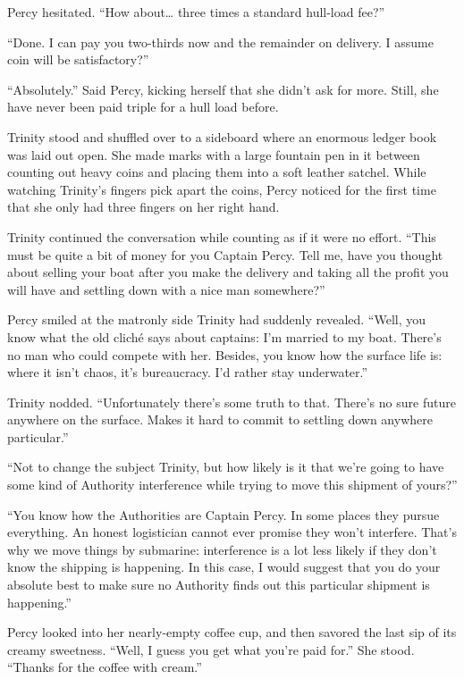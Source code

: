 \documentclass[
]{scrbook}
\begin{document}
Percy hesitated. ``How about\ldots{} three times a standard hull-load
fee?''

``Done. I can pay you two-thirds now and the remainder on delivery. I
assume coin will be satisfactory?''

``Absolutely.'' Said Percy, kicking herself that she didn't ask for
more. Still, she have never been paid triple for a hull load before.

Trinity stood and shuffled over to a sideboard where an enormous ledger
book was laid out open. She made marks with a large fountain pen in it
between counting out heavy coins and placing them into a soft leather
satchel. While watching Trinity's fingers pick apart the coins, Percy
noticed for the first time that she only had three fingers on her right
hand.

Trinity continued the conversation while counting as if it were no
effort. ``This must be quite a bit of money for you Captain Percy. Tell
me, have you thought about selling your boat after you make the delivery
and taking all the profit you will have and settling down with a nice
man somewhere?''

Percy smiled at the matronly side Trinity had suddenly revealed. ``Well,
you know what the old cliché says about captains: I'm married to my
boat. There's no man who could compete with her. Besides, you know how
the surface life is: where it isn't chaos, it's bureaucracy. I'd rather
stay underwater.''

Trinity nodded. ``Unfortunately there's some truth to that. There's no
sure future anywhere on the surface. Makes it hard to commit to settling
down anywhere particular.''

``Not to change the subject Trinity, but how likely is it that we're
going to have some kind of Authority interference while trying to move
this shipment of yours?''

``You know how the Authorities are Captain Percy. In some places they
pursue everything. An honest logistician cannot ever promise they won't
interfere. That's why we move things by submarine: interference is a lot
less likely if they don't know the shipping is happening. In this case,
I would suggest that you do your absolute best to make sure no Authority
finds out this particular shipment is happening.''

Percy looked into her nearly-empty coffee cup, and then savored the last
sip of its creamy sweetness. ``Well, I guess you get what you're paid
for.'' She stood. ``Thanks for the coffee with cream.''
\end{document}
